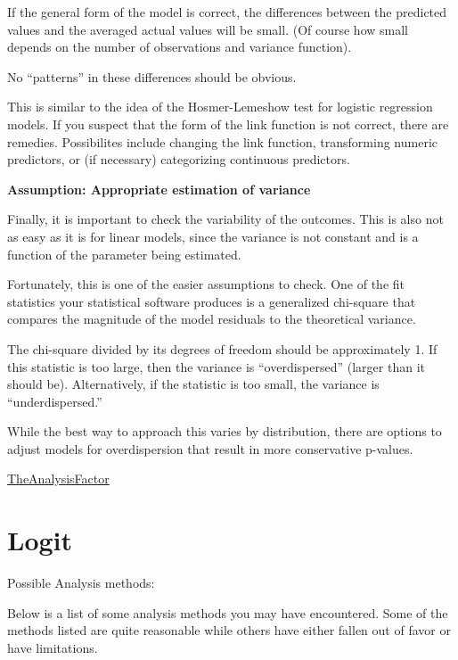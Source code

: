 \documentclass[
]{book}
\begin{document}
If the general form of the model is correct, the differences between the predicted values and the averaged actual values will be small. (Of course how small depends on the number of observations and variance function).

No ``patterns'' in these differences should be obvious.

This is similar to the idea of the Hosmer-Lemeshow test for logistic regression models. If you suspect that the form of the link function is not correct, there are remedies. Possibilites include changing the link function, transforming numeric predictors, or (if necessary) categorizing continuous predictors.

\textbf{Assumption: Appropriate estimation of variance}

Finally, it is important to check the variability of the outcomes. This is also not as easy as it is for linear models, since the variance is not constant and is a function of the parameter being estimated.

Fortunately, this is one of the easier assumptions to check. One of the fit statistics your statistical software produces is a generalized chi-square that compares the magnitude of the model residuals to the theoretical variance.

The chi-square divided by its degrees of freedom should be approximately 1. If this statistic is too large, then the variance is ``overdispersed'' (larger than it should be). Alternatively, if the statistic is too small, the variance is ``underdispersed.''

While the best way to approach this varies by distribution, there are options to adjust models for overdispersion that result in more conservative p-values.

\href{https://www.theanalysisfactor.com/regression-diagnostics-glmm/}{TheAnalysisFactor}

\hypertarget{logit}{%
\section{Logit}\label{logit}}

Possible Analysis methods:

Below is a list of some analysis methods you may have encountered. Some of the methods listed are quite reasonable while others have either fallen out of favor or have limitations.
\end{document}
